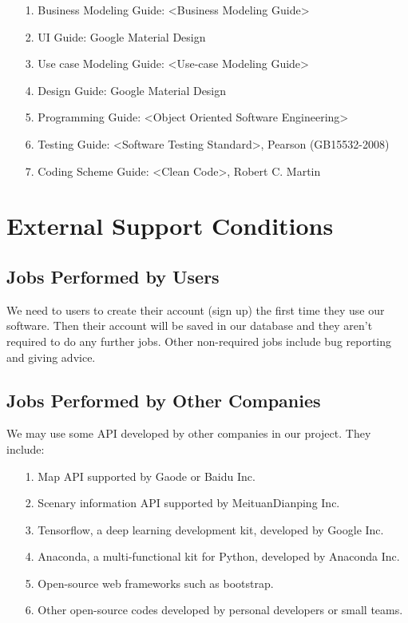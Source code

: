 \documentclass[10pt]{article}
\begin{document}
\begin{itemize}
	\item[1.] Business Modeling Guide: <Business Modeling Guide> 
	\item[2.] UI Guide: Google Material Design
	\item[3.] Use case Modeling Guide: <Use-case Modeling Guide>
	\item[4.] Design Guide: Google Material Design
	\item[5.] Programming Guide: <Object Oriented Software Engineering>
	\item[6.] Testing Guide: <Software Testing Standard>, Pearson (GB15532-2008)
	\item[7.] Coding Scheme Guide: <Clean Code>, Robert C. Martin
\end{itemize}

\section{External Support Conditions}
\subsection{Jobs Performed by Users}
We need to users to create their account (sign up) the first time they use our software. Then their account will be saved in our database and they aren't required to do any further jobs. Other non-required jobs include bug reporting and giving advice.

\subsection{Jobs Performed by Other Companies}
We may use some API developed by other companies in our project. They include:

\begin{itemize}
	\item[1.] Map API supported by Gaode or Baidu Inc. 
	\item[2.] Scenary information API supported by MeituanDianping Inc.
	\item[3.] Tensorflow, a deep learning development kit, developed by Google Inc.
	\item[4.] Anaconda, a multi-functional kit for Python, developed by Anaconda Inc.
	\item[5.] Open-source web frameworks such as bootstrap.
	\item[6.] Other open-source codes developed by personal developers or small teams.
\end{itemize}
\end{document}
